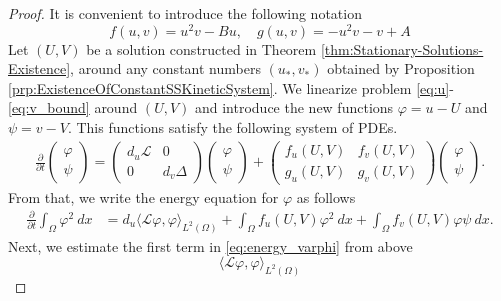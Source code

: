 \documentclass[12pt, a4paper]{article}
\theoremstyle{break}
\theoremstyle{break}
\theoremstyle{break}
\theoremstyle{break}
\theoremstyle{break}
\theoremstyle{break}
\theoremstyle{break}
\begin{document}
\begin{proof}
    It is convenient to introduce the following notation
    \begin{equation}
        \label{eq:non_linearities}
        f(u, v) = u^2v - Bu, \quad g(u,v) = -u^2v - v + A
    \end{equation}
    Let $(U, V)$ be a solution constructed in Theorem \ref{thm:Stationary-Solutions-Existence}, around any constant numbers $(u_*, v_*)$ obtained by Proposition \ref{prp:ExistenceOfConstantSSKineticSystem}. We linearize problem \eqref{eq:u}-\eqref{eq:v_bound} around $(U, V)$ and introduce the new functions $\varphi = u - U$ and $\psi = v - V$. This functions satisfy the following system of PDEs.
    \begin{align*}
        \frac{\partial}{\partial t}
        \begin{pmatrix}
            \varphi \\ \psi
        \end{pmatrix}
        =
        \begin{pmatrix}
            d_u \mathcal{L} & 0 \\ 0 & d_v \Delta
        \end{pmatrix}
        \begin{pmatrix}
            \varphi \\ \psi
        \end{pmatrix}
        +
        \begin{pmatrix}
            f_u(U,V) & f_v(U,V) \\ g_u(U,V) & g_v(U,V)
        \end{pmatrix}
        \begin{pmatrix}
            \varphi \\ \psi
        \end{pmatrix}.
    \end{align*}
    From that, we write the energy equation for $\varphi$ as follows
    \begin{align}
        \label{eq:energy_varphi}
        \frac{\partial}{\partial t} \int_\Omega \varphi^2\:dx 
        &=
        d_u \langle \mathcal{L}\varphi, \varphi \rangle_{L^2(\Omega)} +  \int_\Omega f_u(U,V) \varphi^2 \:dx + \int_\Omega f_v(U,V) \varphi \psi \:dx.
    \end{align}
    Next, we estimate the first term in \eqref{eq:energy_varphi} from above
    \begin{equation}
        \label{eq:energy_varphi_1st_term}
        \langle \mathcal{L}\varphi, \varphi \rangle_{L^2(\Omega)} 

\end{equation}
\end{proof}
\end{document}
